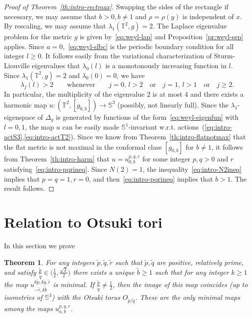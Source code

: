\documentclass{amsart}
\let\ge\geqslant
\theoremstyle{plain}
\newtheorem{theorem}{Theorem}
\theoremstyle{definition}
\theoremstyle{remark}
\begin{document}
\begin{proof}[Proof of Theorem~\ref{th:intro-rectmax}]
Swapping the sides of the rectangle if necessary, we may assume that \(b>0,b\ne
1\) and \(\rho=\rho(y)\) is independent of \(x\). By rescaling, we may assume
that \(\lambda_1(\mathbb T^2,g)=2\). The Laplace eigenvalue problem for the
metric \(g\) is given by~\eqref{eq:weyl-lap} and Proposition~\ref{pr:weyl-sep}
applies. Since \(a=0\),~\eqref{eq:weyl-slbc} is the periodic boundary condition
for all integer \(l\ge 0\). It follows easily from the variational
characterization of Sturm-Liouville eigenvalues that \(\lambda_0(l)\) is a
monotonously increasing function in \(l\). Since \(\lambda_1(\mathbb T^2,g)=2\)
and \(\lambda_0(0)=0\), we have
\[
\lambda_j(l)>2\qquad\text{whenever}\qquad j=0,\,l>2\quad\text{or}\quad
j=1,\,l>1\quad\text{or}\quad j\ge 2.
\]
In particular, the multiplicity of the eigenvalue \(2\) is at most \(4\) and
there exists a harmonic map \(u\colon (\mathbb T^2,[g_{0,b}])\to\mathbb S^3\)
(possibly, not linearly full). Since the \(\lambda_1\)-eigenspace of
\(\Delta_g\) is generated by functions of the form~\eqref{eq:weyl-eigenfun} with
\(l=0,1\), the map \(u\) can be easily made \(\mathbb S^1\)-invariant w.r.t.
actions~(\ref{eq:intro-actS3},\ref{eq:intro-actT2}). Since we know from
Theorem~\ref{th:intro-flatnotmax} that the flat metric is not maximal in the
conformal class \([g_{0,b}]\) for \(b\ne 1\), it follows from
Theorem~\ref{th:intro-harm} that \(u=u_{0,b}^{p,q,r}\) for some integer
\(p,q>0\) and \(r\) satisfying~\eqref{eq:intro-pqrineq}. Since \(N(2)=1\), the
inequality~\eqref{eq:intro-N2ineq} implies that \(p=q=1,r=0\), and
then~\eqref{eq:intro-pqrineq} implies that \(b>1\). The result follows.
\end{proof}

\section{Relation to Otsuki tori}\label{sec:otsuki}

In this section we prove

\begin{theorem}
For any integers \(\tilde p,\tilde q,\tilde r\) such that \(\tilde p,\tilde q\)
are positive, relatively prime, and satisfy \(\frac{\tilde p}{\tilde
q}\in\bigl(\frac{1}2,\frac{\sqrt 2}2\bigr)\) there exists a unique \(\tilde b\ge
1\) such that for any integer \(k\ge 1\) the map \(u_{-\tilde r,k\tilde
b}^{k\tilde p,k\tilde q,\tilde r}\) is minimal. If \(\frac{\tilde p}{\tilde
q}\ne\frac{1}2\), then the image of this map coincides (up to isometries of
\(\mathbb S^3\)) with the Otsuki torus \(O_{\tilde p/\tilde q}\). These are the
only minimal maps among the maps \(u_{a,b}^{p,q,r}\).
\end{theorem}
\end{document}
